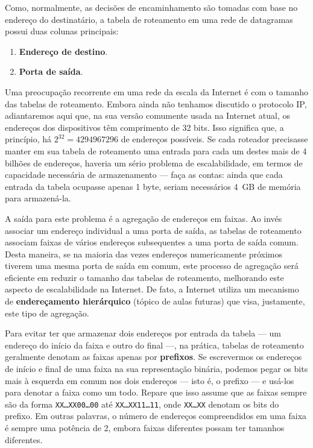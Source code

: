 \documentclass{article}
\begin{document}
Como, normalmente, as decisões de encaminhamento são tomadas com base no endereço do destinatário, a tabela de roteamento em uma rede de datagramas possui duas colunas principais:
\begin{enumerate}
    \item \textbf{Endereço de destino}.
    \item \textbf{Porta de saída}.
\end{enumerate}

Uma preocupação recorrente em uma rede da escala da Internet é com o tamanho das tabelas de roteamento. Embora ainda não tenhamos discutido o protocolo IP, adiantaremos aqui que, na sua versão comumente usada na Internet atual, os endereços dos dispositivos têm comprimento de 32 bits. Isso significa que, a princípio, há $2^{32} = 4294967296$ de endereços possíveis. Se cada roteador precisasse manter em sua tabela de roteamento uma entrada para cada um destes mais de 4 bilhões de endereços, haveria um sério problema de escalabilidade, em termos de capacidade necessária de armazenamento --- faça as contas: ainda que cada entrada da tabela ocupasse apenas 1 byte, seriam necessários 4~GB de memória para armazená-la.

A saída para este problema é a agregação de endereços em faixas. Ao invés associar um endereço individual a uma porta de saída, as tabelas de roteamento associam faixas de vários endereços subsequentes a uma porta de saída comum. Desta maneira, se na maioria das vezes endereços numericamente próximos tiverem uma mesma porta de saída em comum, este processo de agregação será eficiente em reduzir o tamanho das tabelas de roteamento, melhorando este aspecto de escalabilidade na Internet. De fato, a Internet utiliza um mecanismo de \textbf{endereçamento hierárquico} (tópico de aulas futuras) que visa, justamente, este tipo de agregação.

Para evitar ter que armazenar dois endereços por entrada da tabela --- um endereço do início da faixa e outro do final ---, na prática, tabelas de roteamento geralmente denotam as faixas apenas por \textbf{prefixos}. Se escrevermos os endereços de início e final de uma faixa na sua representação binária, podemos pegar os bits mais à esquerda em comum nos dois endereços --- isto é, o prefixo --- e usá-los para denotar a faixa como um todo. Repare que isso assume que as faixas sempre são da forma \texttt{XX\dots XX00\dots 00} até \texttt{XX\dots XX11\dots 11}, onde \texttt{XX\dots XX} denotam os bits do prefixo. Em outras palavras, o número de endereços compreendidos em uma faixa é sempre uma potência de 2, embora faixas diferentes possam ter tamanhos diferentes.
\end{document}
